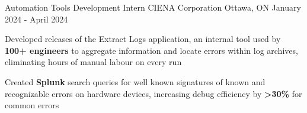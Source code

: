 

\begin{cventries}




	\cventry
	{Automation Tools Development Intern} %
	{CIENA Corporation} %
	{Ottawa, ON} %
	{January 2024 - April 2024} %
	{
		\begin{cvitems} %
			\item {Developed releases of the Extract Logs application, an internal tool used by \textbf{100+ engineers} to aggregate information and locate errors within log archives, eliminating hours of manual labour on every run}
			\item {Created \textbf{Splunk} search queries for well known signatures of known and recognizable errors on hardware devices, increasing debug efficiency by \textbf{>30\%} for common errors}
		\end{cvitems}
	}


\end{cventries}
